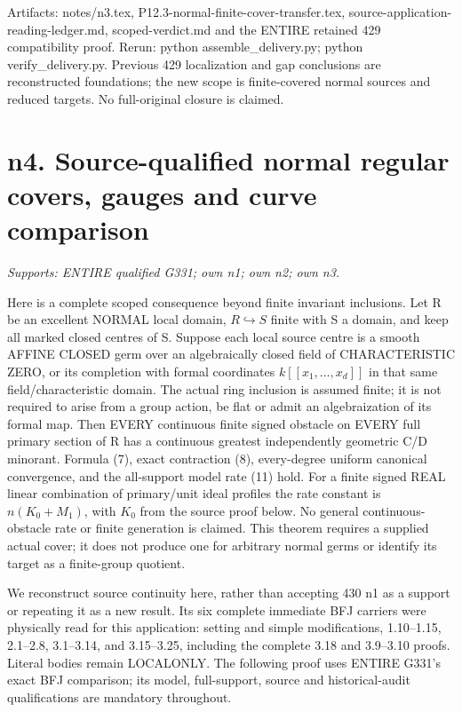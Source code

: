 \documentclass[11pt]{article}
\begin{document}
Artifacts: notes/n3.tex, P12.3-normal-finite-cover-transfer.tex,
source-application-reading-ledger.md, scoped-verdict.md and the ENTIRE
retained 429 compatibility proof. Rerun: python assemble\_delivery.py;
python verify\_delivery.py. Previous 429 localization and gap conclusions
are reconstructed foundations; the new scope is finite-covered normal
sources and reduced targets. No full-original closure is claimed.

\section{n4. Source-qualified normal regular covers, gauges and curve comparison}
\textit{Supports: ENTIRE qualified G331; own n1; own n2; own n3.}

Here is a complete scoped consequence beyond finite invariant inclusions.
Let R be an excellent NORMAL local domain, $R\hookrightarrow S$ finite
with S a domain, and keep all marked closed centres of S. Suppose each
local source centre is a smooth AFFINE CLOSED germ over an algebraically
closed field of CHARACTERISTIC ZERO, or its completion with formal
coordinates $k[[x_1,\ldots,x_d]]$ in that same field/characteristic domain.
The actual ring inclusion is assumed finite; it is not required to arise
from a group action, be flat or admit an algebraization of its formal map.
Then EVERY continuous finite signed obstacle on EVERY full primary
section of R has a continuous greatest independently geometric C/D
minorant. Formula (7), exact contraction (8), every-degree uniform
canonical convergence, and the all-support model rate (11) hold.
For a finite signed REAL linear combination of primary/unit ideal
profiles the rate constant is $n(K_0+M_1)$, with $K_0$ from the source
proof below. No general continuous-obstacle rate or finite generation
is claimed. This theorem requires a supplied actual cover; it does not
produce one for arbitrary normal germs or identify its target as a
finite-group quotient.

We reconstruct source continuity here, rather than accepting 430 n1
as a support or repeating it as a new result. Its six complete immediate
BFJ carriers were physically read for this application: setting and
simple modifications, 1.10--1.15, 2.1--2.8, 3.1--3.14, and 3.15--3.25,
including the complete 3.18 and 3.9--3.10 proofs. Literal bodies remain
LOCALONLY. The following proof uses ENTIRE G331's exact BFJ comparison;
its model, full-support, source and historical-audit qualifications are
mandatory throughout.
\end{document}
